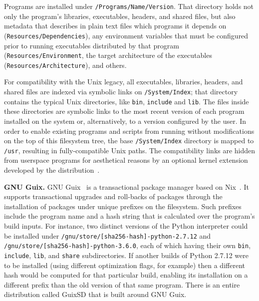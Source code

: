 \documentclass[sigplan, anonymous, 10pt]{acmart}
\begin{document}
Programs are installed under \texttt{/Programs/Name/Version}. That directory holds not
only the program's libraries, executables, headers, and shared files, but also metadata
that describes in plain text files which programs it depends on (\texttt{Resources/Dependencies}),
any environment variables that must be configured prior to running executables distributed
by that program (\texttt{Resources/Environment}, the target architecture of the executables
(\texttt{Resources/Architecture}), and others.

For compatibility with the Unix legacy, all executables, libraries, headers, and shared
files are indexed via symbolic links on \texttt{/System/Index};
that directory contains the typical Unix directories, like \texttt{bin}, \texttt{include}
and \texttt{lib}. The files inside these directories are symbolic links to the
most recent version of each program installed on the system or, alternatively, to a version
configured by the user. In order to enable existing programs and scripts from running
without modifications on the top of this filesystem tree, the base \texttt{/System/Index}
directory is mapped to \texttt{/usr}, resulting in fully-compatible Unix paths.
The compatibility links are hidden from userspace programs for aesthetical reasons
by an optional kernel extension developed by the distribution~\cite{GoboHide}.

\textbf{GNU Guix.}
GNU Guix~\cite{courtes2013:guix} is a transactional package manager based on Nix~\cite{dolstra2004:nix}.
It supports transactional upgrades and
roll-backs of packages through the installation of packages under unique prefixes on the filesystem.
Such prefixes include the program name and a hash string that is calculated over the program's
build inputs. For instance, two distinct versions of the Python interpreter could be installed
under \texttt{/gnu/store/[sha256-hash]-python-2.7.12} and \texttt{/gnu/store/[sha256-hash]-python-3.6.0},
each of which having their own \texttt{bin}, \texttt{include}, \texttt{lib}, and \texttt{share}
subdirectories. If another builds of Python 2.7.12 were to be installed (using different optimization
flags, for example) then a different hash would be computed for that particular build, enabling its
installation on a different prefix than the old version of that same program. There is an entire
distribution called GuixSD that is built around GNU Guix.
\end{document}
